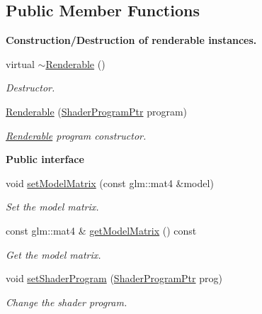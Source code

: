 \subsection*{Public Member Functions}
\begin{Indent}{\bf Construction/\+Destruction of renderable instances.}\par
\begin{DoxyCompactItemize}
\item 
virtual \hyperlink{classRenderable_a4c9e03ac345df99a010c2ad9f8632af2}{$\sim$\+Renderable} ()
\begin{DoxyCompactList}\small\item\em Destructor. \end{DoxyCompactList}\item 
\hyperlink{classRenderable_ae02271675fa76ef56e7e3b8b26d1efb0}{Renderable} (\hyperlink{ShaderProgram_8hpp_af8e4af1ad4c53875ee5d32ab7e1f4966}{Shader\+Program\+Ptr} program)
\begin{DoxyCompactList}\small\item\em \hyperlink{classRenderable}{Renderable} program constructor. \end{DoxyCompactList}\end{DoxyCompactItemize}
\end{Indent}
\begin{Indent}{\bf Public interface}\par
\begin{DoxyCompactItemize}
\item 
void \hyperlink{classRenderable_a70d8b63cc49efc0327bbb119c521dcef}{set\+Model\+Matrix} (const glm\+::mat4 \&model)
\begin{DoxyCompactList}\small\item\em Set the model matrix. \end{DoxyCompactList}\item 
const glm\+::mat4 \& \hyperlink{classRenderable_ab4e9182825d81d3bf3d3822bc26c4714}{get\+Model\+Matrix} () const 
\begin{DoxyCompactList}\small\item\em Get the model matrix. \end{DoxyCompactList}\item 
void \hyperlink{classRenderable_a58242b044ba6359e4d89ed284b96906c}{set\+Shader\+Program} (\hyperlink{ShaderProgram_8hpp_af8e4af1ad4c53875ee5d32ab7e1f4966}{Shader\+Program\+Ptr} prog)
\begin{DoxyCompactList}\small\item\em Change the shader program. \end{DoxyCompactList}\end{DoxyCompactItemize}
\end{Indent}
